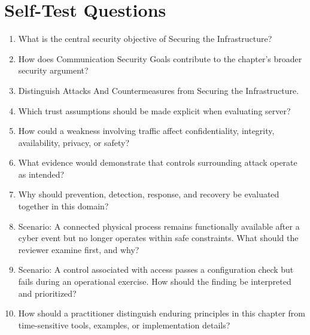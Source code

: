 \documentclass[11pt]{article}
\begin{document}
\section*{Self-Test Questions}
\begin{enumerate}
\item What is the central security objective of Securing the Infrastructure?
\item How does Communication Security Goals contribute to the chapter's broader security argument?
\item Distinguish Attacks And Countermeasures from Securing the Infrastructure.
\item Which trust assumptions should be made explicit when evaluating server?
\item How could a weakness involving traffic affect confidentiality, integrity, availability, privacy, or safety?
\item What evidence would demonstrate that controls surrounding attack operate as intended?
\item Why should prevention, detection, response, and recovery be evaluated together in this domain?
\item Scenario: A connected physical process remains functionally available after a cyber event but no longer operates within safe constraints. What should the reviewer examine first, and why?
\item Scenario: A control associated with access passes a configuration check but fails during an operational exercise. How should the finding be interpreted and prioritized?
\item How should a practitioner distinguish enduring principles in this chapter from time-sensitive tools, examples, or implementation details?
\end{enumerate}
\end{document}

